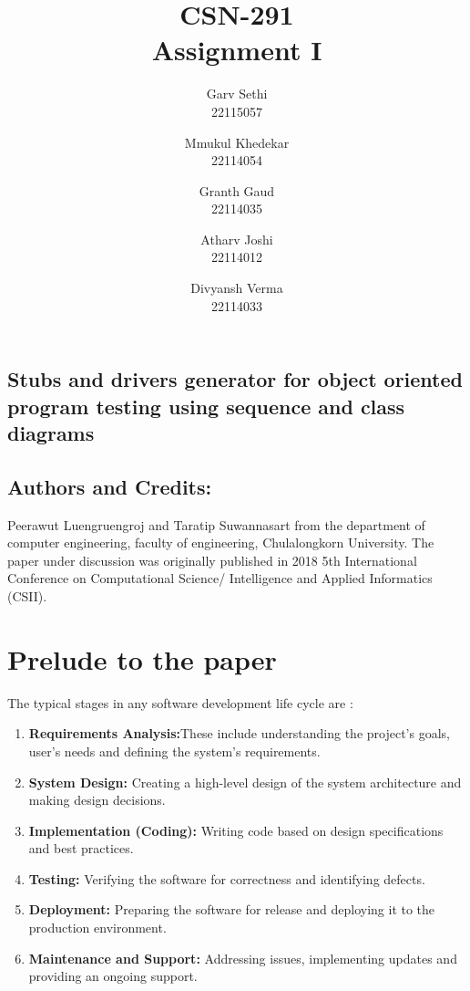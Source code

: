\documentclass{article}
\title{CSN-291\\Assignment I}
\author{Garv Sethi\\22115057\and Mmukul
Khedekar\\22114054\and Granth Gaud\\22114035\and Atharv Joshi\\22114012 \and Divyansh Verma\\22114033 }
\date{}
\begin{document}
\maketitle
\clearpage
\begin{center}
\section*{Stubs and drivers generator for object oriented program testing using sequence and class diagrams}
\end{center}
\subsection*{Authors and Credits: }
Peerawut Luengruengroj and Taratip Suwannasart from the department of computer engineering,
faculty of engineering,
Chulalongkorn University. The paper under discussion was originally published in 2018 5th International Conference on Computational Science/ Intelligence and Applied Informatics (CSII).

\section{Prelude to the paper}
The typical stages in any software development life cycle are \cite{r2} :\\

\begin{enumerate}
    \item \textbf{Requirements Analysis:}These include understanding the project's goals, user's needs and defining the system's requirements.
    \item \textbf{System Design:} Creating a high-level design of the system architecture and making design decisions.
    \item \textbf{Implementation (Coding):} Writing code based on design specifications and best practices.
    \item \textbf{Testing:} Verifying the software for correctness and identifying defects.
    \item \textbf{Deployment:} Preparing the software for release and deploying it to the production environment.
    \item \textbf{Maintenance and Support:} Addressing issues, implementing updates and providing an ongoing support.
\end{enumerate}


\end{document}
